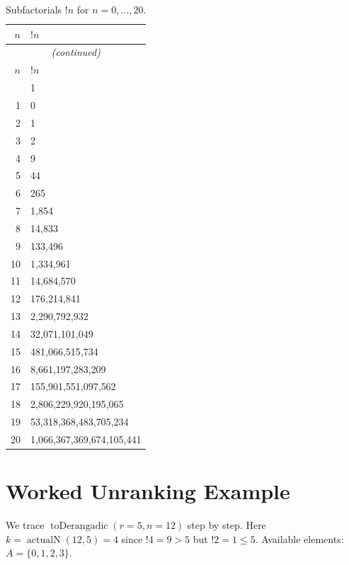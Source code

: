 \documentclass[11pt,a4paper]{article}
\newcommand{\subfact}[1]{!{#1}} %
\newcommand{\actualN}{\operatorname{actualN}}
\begin{document}
    \begin{longtable}{rl}
        \caption{Subfactorials $\subfact{n}$ for $n=0,\dots,20$.}\label{tab:subfact} \\
        \toprule
        $n$ & $\subfact{n}$ \\
        \midrule
        \endfirsthead
        \multicolumn{2}{c}{\textit{(continued)}} \\
        \toprule
        $n$ & $\subfact{n}$ \\
        \midrule
        \endhead
        \bottomrule
        \endfoot
        0 & 1 \\
        1 & 0 \\
        2 & 1 \\
        3 & 2 \\
        4 & 9 \\
        5 & 44 \\
        6 & 265 \\
        7 & 1{,}854 \\
        8 & 14{,}833 \\
        9 & 133{,}496 \\
        10 & 1{,}334{,}961 \\
        11 & 14{,}684{,}570 \\
        12 & 176{,}214{,}841 \\
        13 & 2{,}290{,}792{,}932 \\
        14 & 32{,}071{,}101{,}049 \\
        15 & 481{,}066{,}515{,}734 \\
        16 & 8{,}661{,}197{,}283{,}209 \\
        17 & 155{,}901{,}551{,}097{,}562 \\
        18 & 2{,}806{,}229{,}920{,}195{,}065 \\
        19 & 53{,}318{,}368{,}483{,}705{,}234 \\
        20 & 1{,}066{,}367{,}369{,}674{,}105{,}441 \\
    \end{longtable}

    \section{Worked Unranking Example}
    \label{app:example}

    We trace $\operatorname{toDerangadic}(r=5, n=12)$ step by step.
    Here $k = \actualN(12,5) = 4$ since $\subfact{4} = 9 > 5$ but $\subfact{2} = 1 \leq 5$.
    Available elements: $A = \{0,1,2,3\}$.
\end{document}
